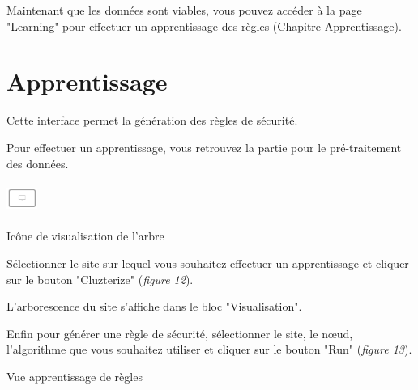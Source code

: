 \documentclass[a4paper,10pt,justified,openany]{tufte-book}
\begin{document}
Maintenant que les données sont viables, vous pouvez accéder à la page "Learning" pour effectuer un apprentissage des règles (Chapitre Apprentissage). 

\chapter{Apprentissage}


Cette interface permet la génération des règles de sécurité.
 
Pour effectuer un apprentissage, vous retrouvez la partie pour le pré-traitement des données. 
 

\begin{marginfigure}
\includegraphics[width=1cm, height=1cm]{./images/visupretraitement.png}
\label{iconevueapprentissage}
\caption{Icône de visualisation de l'arbre}
\end{marginfigure}

Sélectionner le site sur lequel vous souhaitez effectuer un apprentissage et cliquer sur le bouton "Cluzterize" ({\itshape figure 12}). 



L'arborescence du site s'affiche dans le bloc "Visualisation". 
 
Enfin pour générer une règle de sécurité, sélectionner le site, le nœud, l'algorithme que vous souhaitez utiliser et cliquer sur le bouton "Run" ({\itshape figure 13}). 

\begin{marginfigure}
\label{iconevueapprentissage}
\caption{Vue apprentissage de règles}
\end{marginfigure}
\end{document}

